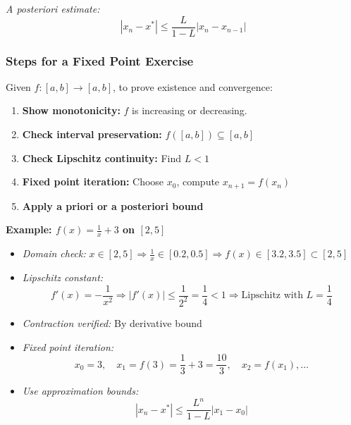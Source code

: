 \emph{A posteriori estimate:}
\[
|x_n - x^*| \le \frac{L}{1 - L} |x_n - x_{n-1}|
\]

\subsubsection{Steps for a Fixed Point Exercise}

Given \(f: [a, b] \to [a, b]\), to prove existence and convergence:

\begin{enumerate}
    \item \textbf{Show monotonicity:} \(f\) is increasing or decreasing.
    \item \textbf{Check interval preservation:} \(f([a, b]) \subseteq [a, b]\)
    \item \textbf{Check Lipschitz continuity:} Find \(L < 1\)
    \item \textbf{Fixed point iteration:} Choose \(x_0\), compute \(x_{n+1} = f(x_n)\)
    \item \textbf{Apply a priori or a posteriori bound}
\end{enumerate}

\textbf{Example: \(f(x) = \frac{1}{x} + 3\) on \([2, 5]\)}

\begin{itemize}[label=\(-\)]
\item \emph{Domain check:} \(x \in [2, 5] \Rightarrow \frac{1}{x} \in [0.2, 0.5] \Rightarrow f(x) \in [3.2, 3.5] \subset [2, 5]\)
\item \emph{Lipschitz constant:}
\[
f'(x) = -\frac{1}{x^2} \Rightarrow |f'(x)| \le \frac{1}{2^2} = \frac{1}{4} < 1
\Rightarrow \text{Lipschitz with } L = \frac{1}{4}
\]
\item \emph{Contraction verified:} By derivative bound
\item \emph{Fixed point iteration:}
\[
x_0 = 3, \quad x_1 = f(3) = \frac{1}{3} + 3 = \frac{10}{3}, \quad x_2 = f(x_1), \dots
\]
\item \emph{Use approximation bounds:}
\[
|x_n - x^*| \le \frac{L^n}{1 - L} |x_1 - x_0|
\]
\end{itemize}
\newpage
